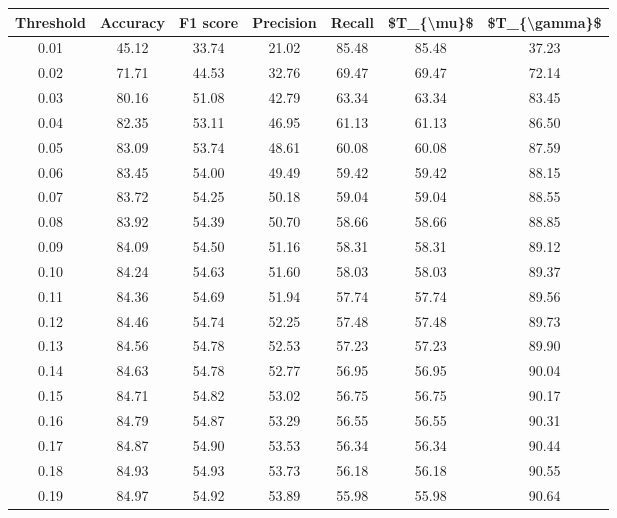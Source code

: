 \begin{tabular}{|c|c|c|c|c|c|c|}
\toprule
 Threshold &  Accuracy &  F1 score &  Precision &  Recall &  \$T\_\{\textbackslash mu\}\$ &  \$T\_\{\textbackslash gamma\}\$ \\
\hline
      0.01 &     45.12 &     33.74 &      21.02 &   85.48 &      85.48 &         37.23 \\
      0.02 &     71.71 &     44.53 &      32.76 &   69.47 &      69.47 &         72.14 \\
      0.03 &     80.16 &     51.08 &      42.79 &   63.34 &      63.34 &         83.45 \\
      0.04 &     82.35 &     53.11 &      46.95 &   61.13 &      61.13 &         86.50 \\
      0.05 &     83.09 &     53.74 &      48.61 &   60.08 &      60.08 &         87.59 \\
      0.06 &     83.45 &     54.00 &      49.49 &   59.42 &      59.42 &         88.15 \\
      0.07 &     83.72 &     54.25 &      50.18 &   59.04 &      59.04 &         88.55 \\
      0.08 &     83.92 &     54.39 &      50.70 &   58.66 &      58.66 &         88.85 \\
      0.09 &     84.09 &     54.50 &      51.16 &   58.31 &      58.31 &         89.12 \\
      0.10 &     84.24 &     54.63 &      51.60 &   58.03 &      58.03 &         89.37 \\
      0.11 &     84.36 &     54.69 &      51.94 &   57.74 &      57.74 &         89.56 \\
      0.12 &     84.46 &     54.74 &      52.25 &   57.48 &      57.48 &         89.73 \\
      0.13 &     84.56 &     54.78 &      52.53 &   57.23 &      57.23 &         89.90 \\
      0.14 &     84.63 &     54.78 &      52.77 &   56.95 &      56.95 &         90.04 \\
      0.15 &     84.71 &     54.82 &      53.02 &   56.75 &      56.75 &         90.17 \\
      0.16 &     84.79 &     54.87 &      53.29 &   56.55 &      56.55 &         90.31 \\
      0.17 &     84.87 &     54.90 &      53.53 &   56.34 &      56.34 &         90.44 \\
      0.18 &     84.93 &     54.93 &      53.73 &   56.18 &      56.18 &         90.55 \\
      0.19 &     84.97 &     54.92 &      53.89 &   55.98 &      55.98 &         90.64 \\

\end{tabular}
